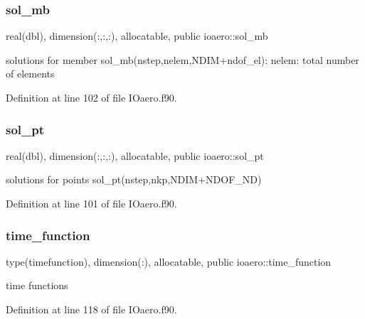 \mbox{\label{namespaceioaero_a4933d28025772ee22892dc12780a8eef}} 
\subsubsection{\texorpdfstring{sol\+\_\+mb}{sol\_mb}}
{\footnotesize\ttfamily real(dbl), dimension(\+:,\+:,\+:), allocatable, public ioaero\+::sol\+\_\+mb}



solutions for member sol\+\_\+mb(nstep,nelem,N\+D\+I\+M+ndof\+\_\+el)\+: nelem\+: total number of elements 



Definition at line 102 of file I\+Oaero.\+f90.

\mbox{\label{namespaceioaero_af6e62942bb38b7b7d69ea25972fe00bf}} 
\subsubsection{\texorpdfstring{sol\+\_\+pt}{sol\_pt}}
{\footnotesize\ttfamily real(dbl), dimension(\+:,\+:,\+:), allocatable, public ioaero\+::sol\+\_\+pt}



solutions for points sol\+\_\+pt(nstep,nkp,N\+D\+I\+M+\+N\+D\+O\+F\+\_\+\+ND) 



Definition at line 101 of file I\+Oaero.\+f90.

\mbox{\label{namespaceioaero_accb03392882ddfd413b5ac9ce3be09c6}} 
\subsubsection{\texorpdfstring{time\+\_\+function}{time\_function}}
{\footnotesize\ttfamily type(timefunction), dimension(\+:), allocatable, public ioaero\+::time\+\_\+function}



time functions 



Definition at line 118 of file I\+Oaero.\+f90.

